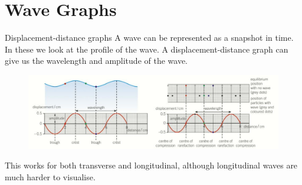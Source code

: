 \documentclass[../Main.tex]{subfiles}
\begin{document}
\author{Wave Graphs} %
\date{Year 1 Topic 16} %

\section{Wave Graphs} %

\begin{frame}{Displacement-distance graphs}
    A wave can be represented as a snapshot in time. In these we look at the profile of the wave. A displacement-distance graph can give us the wavelength and amplitude of the wave. 
    
    \begin{figure}
        \centering
        \includegraphics[width=\textwidth]{Waves_Images/displacement_distance_graph.png}
    \end{figure}
    
    This works for both transverse and longitudinal, although longitudinal waves are much harder to visualise.
\end{frame}
\end{document}

